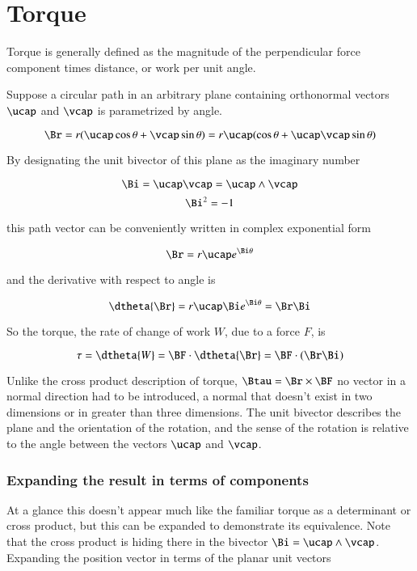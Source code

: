 \chapter{Torque}
\label{chap:gaWikiTorque}
\date{ Oct 13, 2007.  $RCSfile: gaWikiTorque.tex,v $ Last $Revision: 1.12 $ $Date: 2009/06/14 17:59:59 $ }

Torque is generally defined as the magnitude of the perpendicular force component times distance, or work per unit angle.

Suppose a circular path in an arbitrary plane containing orthonormal vectors $\ucap$ and $\vcap$ is parametrized by angle.

\[
\Br = r(\ucap \cos \theta + \vcap \sin \theta) = r \ucap(\cos \theta + \ucap \vcap \sin \theta)
\]

By designating the unit bivector of this plane as the imaginary number

\[
\Bi  = \ucap \vcap = \ucap \wedge \vcap
\]
\[
\Bi ^2 = -1
\]

this path vector can be conveniently written in complex exponential form

\[
\Br = r \ucap e^{\Bi \theta}
\]

and the derivative with respect to angle is

\[
\dtheta{\Br} = r \ucap \Bi  e^{\Bi  \theta} = \Br  \Bi 
\]

So the torque, the rate of change of work $W$, due to a force $F$, is

\[
\tau = \dtheta{W} = \BF \cdot \dtheta{\Br} = \BF \cdot (\Br  \Bi )
\]

Unlike the cross product description of torque, $\Btau = \Br \times \BF$ no vector in a normal direction had to be introduced, a normal that doesn't exist in two dimensions or in greater than three dimensions.  The unit bivector describes the plane and the orientation of the rotation, and the sense of the rotation is relative to the angle between the vectors $\ucap$ and $\vcap$.

\subsection{Expanding the result in terms of components }

At a glance this doesn't appear much like the familiar torque as a determinant or cross product, but this can be expanded to demonstrate its equivalence.  Note that the cross product is hiding there in the bivector $\Bi = \ucap \wedge \vcap$.  Expanding the position vector in terms of the planar unit vectors 

